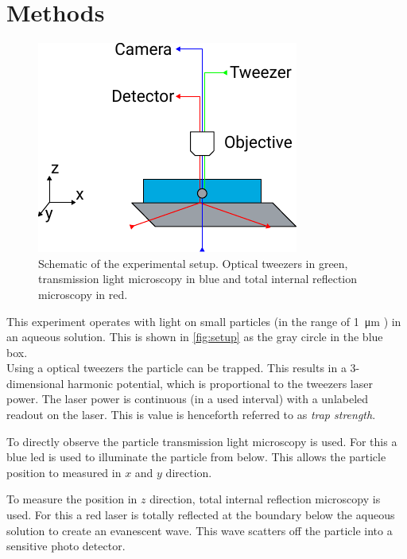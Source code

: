\documentclass[
    twoside=false,
    twocolumn=true,
    fontsize=11pt,
]{scrarticle}
\begin{document}


\section{Methods}
\begin{figure}
    \centering
    \includegraphics{figures/setup.pdf}
    \caption{Schematic of the experimental setup. Optical tweezers in green, transmission light microscopy in blue and total internal reflection microscopy in red.}
    \label{fig:setup}
\end{figure}
This experiment operates with light on small particles (in the range of \SI{1}{\micro m} \cite{instructions}) in an aqueous solution.
This is shown in \autoref{fig:setup} as the gray circle in the blue box. \\
Using a optical tweezers the particle can be trapped.
This results in a 3-dimensional harmonic potential, which is proportional to the tweezers laser power.
The laser power is continuous (in a used interval) with a unlabeled readout on the laser.
This is value is henceforth referred to as \emph{trap strength}.

To directly observe the particle transmission light microscopy is used.
For this a blue led is used to illuminate the particle from below.
This allows the particle position to measured in $x$ and $y$ direction.

To measure the position in $z$ direction, total internal reflection microscopy is used.
For this a red laser is totally reflected at the boundary below the aqueous solution to create an evanescent wave.
This wave scatters off the particle into a sensitive photo detector.
\end{document}
